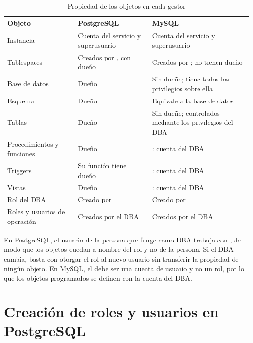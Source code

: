\begin{table}[H]
	\centering
	\small
	\caption{Propiedad de los objetos en cada gestor}
	\label{tab:propiedad}
	\begin{tabular}{@{}L{3.6cm} L{6.2cm} L{6.2cm}@{}}
		\toprule
		\textbf{Objeto} & \textbf{PostgreSQL} & \textbf{MySQL} \\
		\midrule
		Instancia & Cuenta del servicio y superusuario  & Cuenta del servicio y superusuario  \\
		Tablespaces & Creados por , con dueño  & Creados por ; no tienen dueño \\
		Base de datos & Dueño  & Sin dueño;  tiene todos los privilegios sobre ella \\
		Esquema & Dueño  & Equivale a la base de datos \\
		Tablas & Dueño  & Sin dueño; controlados mediante los privilegios del DBA \\
		Procedimientos y funciones & Dueño  & : cuenta del DBA \\
		Triggers & Su función tiene dueño  & : cuenta del DBA \\
		Vistas & Dueño  & : cuenta del DBA \\
		Rol del DBA & Creado por  & Creado por  \\
		Roles y usuarios de operación & Creados por el DBA & Creados por el DBA \\
		\bottomrule
	\end{tabular}
\end{table}

En PostgreSQL, el usuario de la persona que funge como DBA trabaja con , de modo que los objetos quedan a nombre del rol y no de la persona. Si el DBA cambia, basta con otorgar el rol al nuevo usuario sin transferir la propiedad de ning\'un objeto. En MySQL, el  debe ser una cuenta de usuario y no un rol, por lo que los objetos programados se definen con la cuenta del DBA.

\section{Creaci\'on de roles y usuarios en PostgreSQL}
\label{sec:roles-pg}

